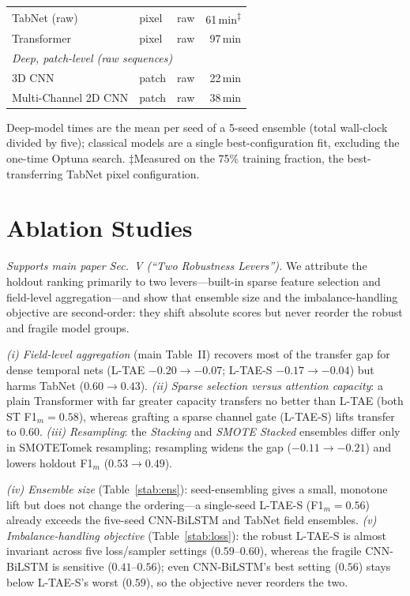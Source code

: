 \documentclass[journal]{IEEEtran}
\begin{document}
\begin{table}[!t]
\begin{tabular}{lllr}
TabNet (raw)           & pixel & raw & 61\,min\textsuperscript{$\ddagger$} \\
Transformer            & pixel & raw & 97\,min \\
\midrule
\multicolumn{4}{l}{\emph{Deep, patch-level (raw sequences)}}\\
3D CNN                 & patch & raw & 22\,min \\
Multi-Channel 2D CNN   & patch & raw & 38\,min \\
\bottomrule
\end{tabular}
\par\vspace{3pt}
\begin{minipage}{\columnwidth}
\footnotesize
Deep-model times are the mean per seed of a 5-seed ensemble (total wall-clock divided by five);
classical models are a single best-configuration fit, excluding the one-time Optuna search.
$\ddagger$Measured on the 75\% training fraction, the best-transferring TabNet pixel configuration.
\end{minipage}
\end{table}

\section{Ablation Studies}
\label{sec:ablation}
\emph{Supports main paper Sec.~V (``Two Robustness Levers'').}
We attribute the holdout ranking primarily to two levers---built-in sparse feature selection and
field-level aggregation---and show that ensemble size and the imbalance-handling objective are
second-order: they shift absolute scores but never reorder the robust and fragile model groups.

\emph{(i) Field-level aggregation} (main Table~II) recovers most of the transfer gap for dense
temporal nets (L-TAE $-0.20\rightarrow-0.07$; L-TAE-S $-0.17\rightarrow-0.04$) but harms TabNet
($0.60\rightarrow0.43$). \emph{(ii) Sparse selection versus attention capacity}: a plain Transformer
with far greater capacity transfers no better than L-TAE (both ST F1$_m=0.58$), whereas grafting a
sparse channel gate (L-TAE-S) lifts transfer to $0.60$. \emph{(iii) Resampling}: the \emph{Stacking}
and \emph{SMOTE Stacked} ensembles differ only in SMOTETomek resampling; resampling widens the gap
($-0.11\rightarrow-0.21$) and lowers holdout F1$_m$ ($0.53\rightarrow0.49$).

\emph{(iv) Ensemble size} (Table~\ref{stab:ens}): seed-ensembling gives a small, monotone lift but
does not change the ordering---a single-seed L-TAE-S (F1$_m=0.56$) already exceeds the five-seed
CNN-BiLSTM and TabNet field ensembles. \emph{(v) Imbalance-handling objective}
(Table~\ref{stab:loss}): the robust L-TAE-S is almost invariant across five loss/sampler settings
($0.59$--$0.60$), whereas the fragile CNN-BiLSTM is sensitive ($0.41$--$0.56$); even CNN-BiLSTM's
best setting ($0.56$) stays below L-TAE-S's worst ($0.59$), so the objective never reorders the two.
\end{document}
